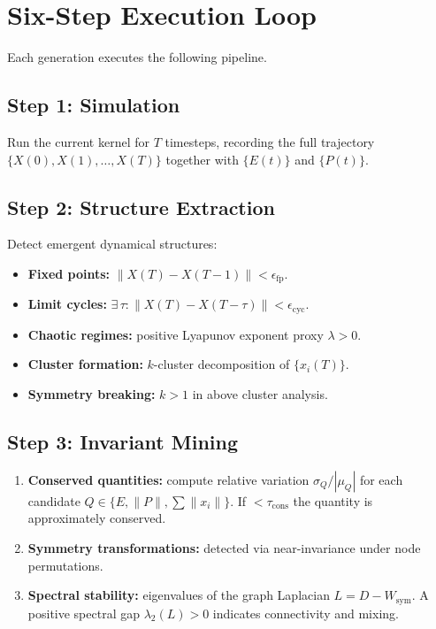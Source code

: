 \section{Six-Step Execution Loop}
\label{sec:mppk-loop}

Each generation executes the following pipeline.

\subsection{Step 1: Simulation}

Run the current kernel for $T$ timesteps, recording the full
trajectory $\{X(0), X(1), \dots, X(T)\}$ together with
$\{E(t)\}$ and $\{P(t)\}$.

\subsection{Step 2: Structure Extraction}

Detect emergent dynamical structures:
\begin{itemize}[nosep]
  \item \textbf{Fixed points:}
        $\|X(T) - X(T{-}1)\| < \epsilon_{\mathrm{fp}}$.
  \item \textbf{Limit cycles:}
        $\exists\,\tau:\|X(T) - X(T{-}\tau)\| < \epsilon_{\mathrm{cyc}}$.
  \item \textbf{Chaotic regimes:}
        positive Lyapunov exponent proxy $\lambda>0$.
  \item \textbf{Cluster formation:}
        $k$-cluster decomposition of $\{x_i(T)\}$.
  \item \textbf{Symmetry breaking:}
        $k>1$ in above cluster analysis.
\end{itemize}

\subsection{Step 3: Invariant Mining}

\begin{enumerate}[nosep]
  \item \textbf{Conserved quantities:} compute relative variation
        $\sigma_Q / |\mu_Q|$ for each candidate $Q\in\{E, \|P\|, \sum\|x_i\|\}$.
        If $<\tau_{\mathrm{cons}}$ the quantity is approximately conserved.
  \item \textbf{Symmetry transformations:} detected via near-invariance
        under node permutations.
  \item \textbf{Spectral stability:} eigenvalues of the graph Laplacian
        $L = D - W_{\mathrm{sym}}$.  A positive spectral gap
        $\lambda_2(L)>0$ indicates connectivity and mixing.
\end{enumerate}

